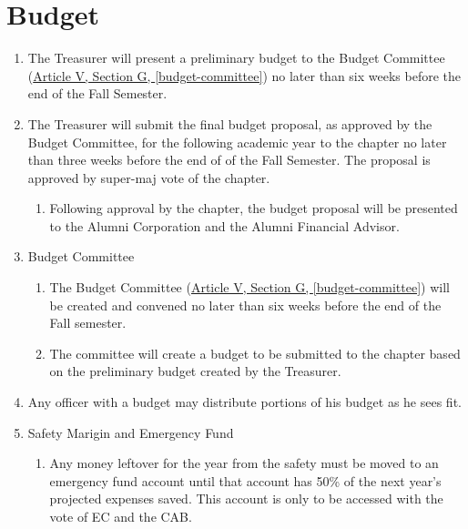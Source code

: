 \section{Budget}
	\label{budget}
	\begin{enumerate}
		\item The Treasurer will present a preliminary budget to the Budget Committee (\hyperref[budget-committee]{Article V, Section G, \autoref*{budget-committee}}) no later than six weeks before the end of the Fall Semester.
		\item The Treasurer will submit the final budget proposal, as approved by the Budget Committee, for the following academic year to the chapter no later than three weeks before the end of of the Fall Semester. The proposal is approved by \gls{super-maj} vote of the chapter.
			\begin{enumerate}
				\item Following approval by the chapter, the budget proposal will be presented to the Alumni Corporation and the Alumni Financial Advisor.
			\end{enumerate}
            

		\item Budget Committee
			\begin{enumerate}
				\item The Budget Committee (\hyperref[budget-committee]{Article V, Section G, \autoref*{budget-committee}}) will be created and convened no later than six weeks before the end of the Fall semester.
				\item The committee will create a budget to be submitted to the chapter based on the preliminary budget created by the Treasurer.
			\end{enumerate}
          
        \item Any officer with a budget may distribute portions of his budget as he sees fit.
	
    
    	\item Safety Marigin and Emergency Fund
        	\begin{enumerate}
            	\item Any money leftover for the year from the \gls{safety} must be moved to an emergency fund account until that account has 50\% of the next year’s projected expenses saved. This account is only to be accessed with the vote of EC and the CAB.
             \end{enumerate}
     \end{enumerate}

